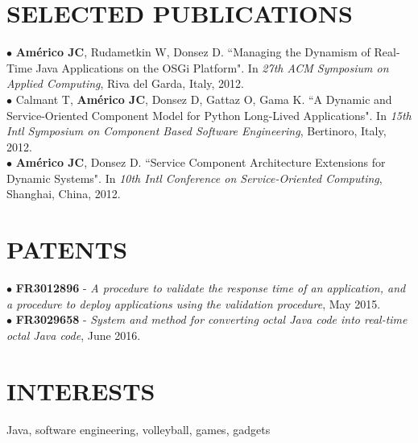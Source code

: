 \documentclass[margin]{res}
\begin{document}
\begin{resume}
		\section{SELECTED PUBLICATIONS} 	
			$\bullet$ {\bf Am\'{e}rico JC}, Rudametkin W, Donsez D. ``Managing the Dynamism of Real-Time Java Applications on the OSGi Platform". In {\sl 27th ACM Symposium on Applied Computing}, Riva del Garda, Italy, 2012. 
			\vspace{1mm}\\
			$\bullet$ Calmant T, {\bf Am\'{e}rico JC}, Donsez D, Gattaz O, Gama K. ``A Dynamic and Service-Oriented Component Model for Python Long-Lived Applications". In {\sl 15th Intl Symposium on Component Based Software Engineering}, Bertinoro, Italy, 2012.
			\vspace{1mm}\\
			$\bullet$ {\bf Am\'{e}rico JC}, Donsez D. ``Service Component Architecture Extensions for Dynamic Systems". In {\sl 10th Intl Conference on Service-Oriented Computing}, Shanghai, China, 2012.
			\vspace{-2mm} 
		\section{PATENTS} 	
			$\bullet$ {\bf FR3012896} - {\sl A procedure to validate the response time of an application, and a procedure to deploy applications using the validation procedure}, May 2015.
			\vspace{1mm}\\
			$\bullet$ {\bf FR3029658} - {\sl System and method for converting octal Java code into real-time octal Java code}, June 2016.
			\vspace{-2mm} 
		\section{INTERESTS} Java, software engineering, volleyball, games, gadgets
	\end{resume}
\end{document}
